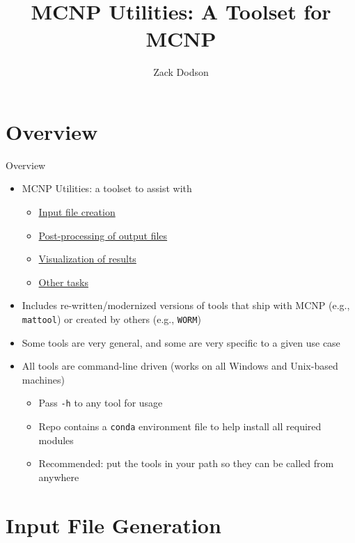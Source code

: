 \documentclass[aspectratio=169]{beamer}
\title{MCNP Utilities: A Toolset for MCNP}
\author{Zack Dodson}
\date{}
\begin{document}
\begin{frame}
  \titlepage
\end{frame}

\section{Overview}

\begin{frame}{Overview}
  \begin{itemize}
    \item{
      MCNP Utilities: a toolset to assist with
      \begin{itemize}
        \item{\hyperlink{sec:input-file-generation}{Input file creation}}
        \item{\hyperlink{sec:post-processors}{Post-processing of output files}}
        \item{\hyperlink{sec:visualization}{Visualization of results}}
        \item{\hyperlink{sec:aux}{Other tasks}}
      \end{itemize}
    }
    \item{Includes re-written/modernized versions of tools that ship with MCNP (e.g., \lstinline{mattool}) or created by others (e.g., \lstinline{WORM})}
    \item{Some tools are very general, and some are very specific to a given use case}
    \item{
      All tools are command-line driven (works on all Windows and Unix-based machines)
      \begin{itemize}
        \item{Pass \lstinline{-h} to any tool for usage}
        \item{Repo contains a \lstinline{conda} environment file to help install all required modules}
        \item{Recommended: put the tools in your path so they can be called from anywhere}
      \end{itemize}
    }
  \end{itemize}
\end{frame}

\section{Input File Generation}\label{sec:input-file-generation}
\end{document}
